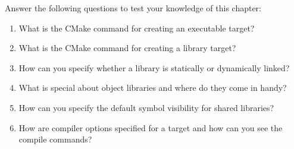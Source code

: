Answer the following questions to test your knowledge of this chapter:

\begin{enumerate}
\item 
What is the CMake command for creating an executable target?
	
\item 
What is the CMake command for creating a library target?

\item 
How can you specify whether a library is statically or dynamically linked?

\item 
What is special about object libraries and where do they come in handy?

\item 
How can you specify the default symbol visibility for shared libraries?

\item 
How are compiler options specified for a target and how can you see the
compile commands?
\end{enumerate}